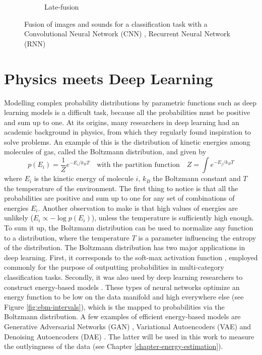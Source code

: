 \begin{figure}[!h]
\begin{subfigure}{.45\textwidth}
  \vspace*{2mm}
  \caption{Late-fusion}
  \label{fig:late-fusion}
\end{subfigure}
\caption[Early and late fusion]{Fusion of images and sounds for a classification task with a Convolutional Neural Network (CNN) \citep{image-recognition}, Recurrent Neural Network (RNN) \citep{machine-translation}}
\label{fig:fusion}
\end{figure}


\section{Physics meets Deep Learning}\label{sec:ebm}
Modelling complex probability distributions by parametric functions such as deep learning models is a difficult task, because all the probabilities must be positive and sum up to one. At its origins, many researchers in deep learning had an academic background in physics, from which they regularly found inspiration to solve problems. An example of this is the distribution of kinetic energies among molecules of gas, called the Boltzmann distribution, and given by
\begin{equation}
p(E_i) = \frac{1}{Z}e^{-E_i/k_B T} \quad \text{with the partition function} \quad Z = \int e^{-E_j/k_B T}
\label{eq:boltzmann-distrib}
\end{equation}
where $E_i$ is the kinetic energy of molecule $i$, $k_B$ the Boltzmann constant and $T$ the temperature of the environment. The first thing to notice is that all the probabilities are positive and sum up to one for any set of combinations of energies $E_i$. Another observation to make is that high values of energies are unlikely ($E_i \propto -\log p(E_i)$), unless the temperature is sufficiently high enough. To sum it up, the Boltzmann distribution can be used to normalize any function to a distribution, where the temperature $T$ is a parameter influencing the entropy of the distribution. The Boltzmann distribution has two major applications in deep learning. First, it corresponds to the soft-max activation function \citep{softmax}, employed commonly for the purpose of outputting probabilities in multi-category classification tasks. Secondly, it was also used by deep learning researchers to construct energy-based models \citep{ebm-tutorial}. These types of neural networks optimize an energy function to be low on the data manifold and high everywhere else (see Figure \ref{fig:ebm-intervals}), which is the mapped to probabilities via the Boltzmann distribution. A few examples of efficient energy-based models are Generative Adversarial Networks (GAN) \citep{gan}, Variational Autoencoders (VAE) \citep{kingma-vae} and Denoising Autoencoders (DAE) \citep{dae-vincent}. The latter will be used in this work to measure the outlyingness of the data (see Chapter \ref{chapter-energy-estimation}).
